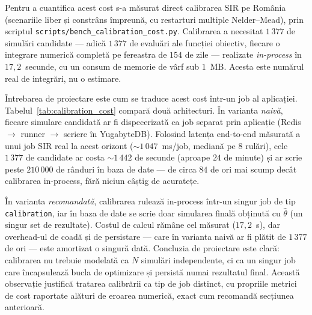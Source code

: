 Pentru a cuantifica acest cost s-a măsurat direct calibrarea SIR pe România
(scenariile liber și constrâns împreună, cu restarturi multiple Nelder--Mead),
prin scriptul \texttt{scripts/bench\_calibration\_cost.py}. Calibrarea a necesitat
$1\,377$ de simulări candidate --- adică $1\,377$ de evaluări ale funcției
obiectiv, fiecare o integrare numerică completă pe fereastra de $154$ de zile ---
realizate \emph{in-process} în $17{,}2$~secunde, cu un consum de memorie de vârf
sub $1$~MB. Acesta este numărul real de integrări, nu o estimare.

Întrebarea de proiectare este cum se traduce acest cost într-un job al aplicației.
Tabelul~\ref{tab:calibration_cost} compară două arhitecturi. În varianta
\emph{naivă}, fiecare simulare candidată ar fi dispecerizată ca job separat prin
aplicație (Redis $\rightarrow$ runner $\rightarrow$ scriere în YugabyteDB).
Folosind latența end-to-end măsurată a unui job SIR real la acest orizont
($\sim$$1\,047$~ms/job, mediană pe $8$ rulări), cele $1\,377$ de candidate ar
costa $\sim$$1\,442$ de secunde (aproape $24$ de minute) și ar scrie peste
$210\,000$ de rânduri în baza de date --- de circa $84$ de ori mai scump decât
calibrarea in-process, fără niciun câștig de acuratețe.



În varianta \emph{recomandată}, calibrarea rulează in-process într-un singur job
de tip \texttt{calibration}, iar în baza de date se scrie doar simularea finală
obținută cu $\hat{\theta}$ (un singur set de rezultate). Costul de calcul rămâne
cel măsurat ($17{,}2$~s), dar overhead-ul de coadă și de persistare --- care în
varianta naivă ar fi plătit de $1\,377$ de ori --- este amortizat o singură dată.
Concluzia de proiectare este clară: calibrarea nu trebuie modelată ca $N$ simulări
independente, ci ca un singur job care încapsulează bucla de optimizare și
persistă numai rezultatul final. Această observație justifică tratarea calibrării
ca tip de job distinct, cu propriile metrici de cost raportate alături de eroarea
numerică, exact cum recomandă secțiunea anterioară.
